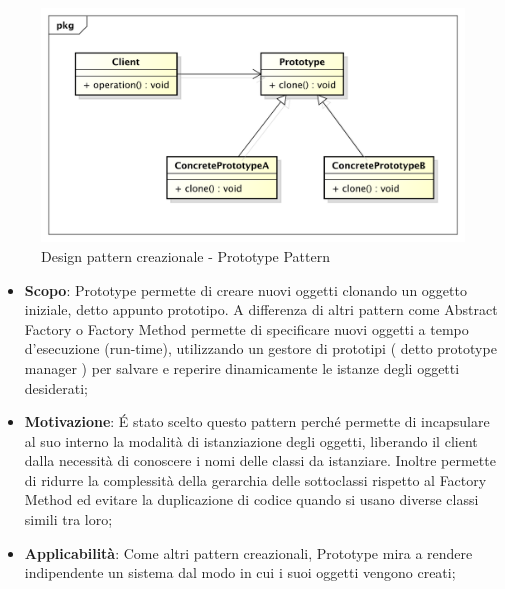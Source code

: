 		\begin{figure}[htbp]
			\centering
			\centerline{\includegraphics[scale=0.5]{./images/designpatternappendice/prototype.pdf}}
			\caption{Design pattern creazionale - Prototype Pattern}
		\end{figure}

		\begin{itemize}
			\item \textbf{Scopo}: Prototype permette di creare nuovi oggetti clonando un oggetto iniziale, detto appunto prototipo. A differenza di altri pattern come Abstract Factory o Factory Method permette di specificare nuovi oggetti a tempo d'esecuzione (run-time), utilizzando un gestore di prototipi ( detto prototype manager ) per salvare e reperire dinamicamente le istanze degli oggetti desiderati;

			\item \textbf{Motivazione}: \'E stato scelto questo pattern perché permette di incapsulare al suo interno la modalità di istanziazione degli oggetti, liberando il client dalla necessità di conoscere i nomi delle classi da istanziare. Inoltre permette di ridurre la complessità della gerarchia delle sottoclassi rispetto al Factory Method ed evitare la duplicazione di codice quando si usano diverse classi simili tra loro;

			\item \textbf{Applicabilità}: Come altri pattern creazionali, Prototype mira a rendere indipendente un sistema dal modo in cui i suoi oggetti vengono creati;

		\end{itemize}

		\newpage
